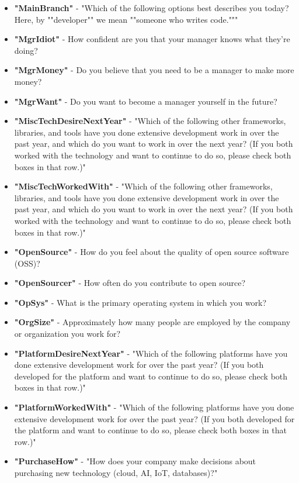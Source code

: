 \begin{appendices}
\begin{itemize}
        \item \textbf{"MainBranch"} - "Which of the following options best describes you today? Here, by ""developer"" we mean ""someone who writes code."""
        \item \textbf{"MgrIdiot"} - How confident are you that your manager knows what they’re doing?
        \item \textbf{"MgrMoney"} - Do you believe that you need to be a manager to make more money?
        \item \textbf{"MgrWant"} - Do you want to become a manager yourself in the future?
        \item \textbf{"MiscTechDesireNextYear"} - "Which of the following other frameworks, libraries, and tools have you done extensive development work in over the past year, and which do you want to work in over the next year? (If you both worked with the technology and want to continue to do so, please check both boxes in that row.)"
        \item \textbf{"MiscTechWorkedWith"} - "Which of the following other frameworks, libraries, and tools have you done extensive development work in over the past year, and which do you want to work in over the next year? (If you both worked with the technology and want to continue to do so, please check both boxes in that row.)"
        \item \textbf{"OpenSource"} - How do you feel about the quality of open source software (OSS)?
        \item \textbf{"OpenSourcer"} - How often do you contribute to open source?
        \item \textbf{"OpSys"} - What is the primary operating system in which you work?
        \item \textbf{"OrgSize"} - Approximately how many people are employed by the company or organization you work for?
        \item \textbf{"PlatformDesireNextYear"} - "Which of the following platforms have you done extensive development work for over the past year?   (If you both developed for the platform and want to continue to do so, please check both boxes in that row.)"
        \item \textbf{"PlatformWorkedWith"} - "Which of the following platforms have you done extensive development work for over the past year?   (If you both developed for the platform and want to continue to do so, please check both boxes in that row.)"
        \item \textbf{"PurchaseHow"} - "How does your company make decisions about purchasing new technology (cloud, AI, IoT, databases)?"

\end{itemize}
\end{appendices}
